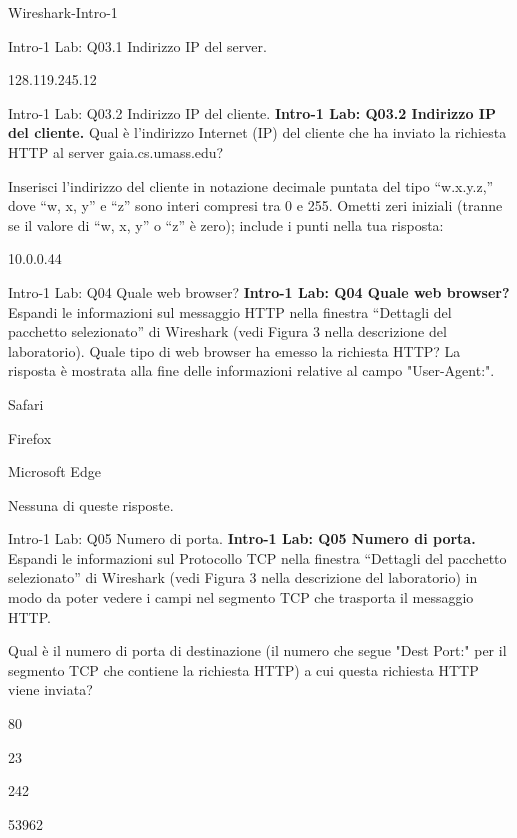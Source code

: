 \documentclass[a4paper]{article}
\begin{document}
\begin{quiz}{Wireshark-Intro-1}
\begin{shortanswer}[points=1]{Intro-1 Lab: Q03.1 Indirizzo IP del server.}
\item 128.119.245.12
\end{shortanswer}

\begin{shortanswer}[points=1]{Intro-1 Lab: Q03.2 Indirizzo IP del cliente.}
\textbf{Intro-1 Lab: Q03.2 Indirizzo IP del cliente.}
Qual è l'indirizzo Internet (IP) del cliente che ha inviato la richiesta HTTP al server gaia.cs.umass.edu?

Inserisci l'indirizzo del cliente in notazione decimale puntata del tipo ``w.x.y.z,'' dove ``w, x, y'' e ``z'' sono interi compresi tra 0 e 255. Ometti zeri iniziali (tranne se il valore di ``w, x, y'' o ``z'' è zero); include i punti nella tua risposta:

\item 10.0.0.44
\end{shortanswer}

\begin{multi}[points=1]{Intro-1 Lab: Q04 Quale web browser?}
\textbf{Intro-1 Lab: Q04 Quale web browser?}
Espandi le informazioni sul messaggio HTTP nella finestra ``Dettagli del pacchetto selezionato'' di Wireshark (vedi Figura 3 nella descrizione del laboratorio). Quale tipo di web browser ha emesso la richiesta HTTP? La risposta è mostrata alla fine delle informazioni relative al campo "User-Agent:".

\item Safari
\item* Firefox
\item Microsoft Edge
\item Nessuna di queste risposte.
\end{multi}

\begin{multi}[points=1]{Intro-1 Lab: Q05 Numero di porta.}
\textbf{Intro-1 Lab: Q05 Numero di porta.}
Espandi le informazioni sul Protocollo TCP nella finestra ``Dettagli del pacchetto selezionato'' di Wireshark (vedi Figura 3 nella descrizione del laboratorio) in modo da poter vedere i campi nel segmento TCP che trasporta il messaggio HTTP.

Qual è il numero di porta di destinazione (il numero che segue "Dest Port:" per il segmento TCP che contiene la richiesta HTTP) a cui questa richiesta HTTP viene inviata?

\item* 80
\item 23
\item 242
\item 53962
\end{multi}

\end{quiz}
\end{document}
